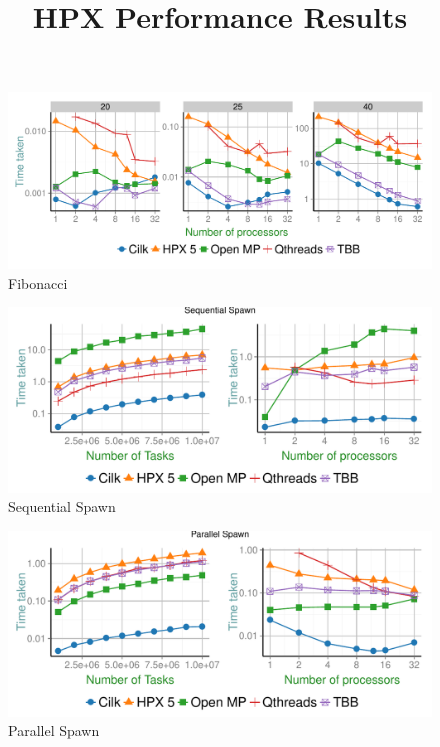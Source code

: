 \documentclass[10pt]{article}
\title{HPX Performance Results}
\author{}
\begin{document}
\maketitle

\begin{figure}[!ht]
\centering
\includegraphics[scale=0.8]{cutter/plots/fib}
\caption{Fibonacci}
\label{fig:fib}
\end{figure}

\begin{figure}[!ht]
\centering
\includegraphics[scale=0.8]{cutter/plots/seq}
\caption{Sequential Spawn}
\label{fig:seq}
\end{figure}

\begin{figure}[!ht]
\centering
\includegraphics[scale=0.8]{cutter/plots/par}
\caption{Parallel Spawn}
\label{fig:par}
\end{figure}
\end{document}

